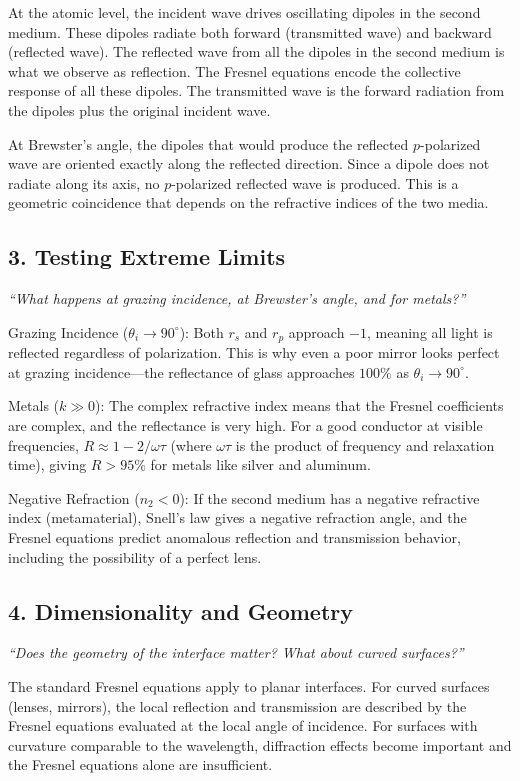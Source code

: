 \documentclass[11pt,openright]{book}
\begin{document}
At the atomic level, the incident wave drives oscillating dipoles in the second medium. These dipoles radiate both forward (transmitted wave) and backward (reflected wave). The reflected wave from all the dipoles in the second medium is what we observe as reflection. The Fresnel equations encode the collective response of all these dipoles. The transmitted wave is the forward radiation from the dipoles plus the original incident wave.

At Brewster's angle, the dipoles that would produce the reflected $p$-polarized wave are oriented exactly along the reflected direction. Since a dipole does not radiate along its axis, no $p$-polarized reflected wave is produced. This is a geometric coincidence that depends on the refractive indices of the two media.

\subsection*{3. Testing Extreme Limits}
\textit{``What happens at grazing incidence, at Brewster's angle, and for metals?''}

Grazing Incidence ($\theta_i \to 90^\circ$): Both $r_s$ and $r_p$ approach $-1$, meaning all light is reflected regardless of polarization. This is why even a poor mirror looks perfect at grazing incidence---the reflectance of glass approaches $100\%$ as $\theta_i \to 90^\circ$.

Metals ($k \gg 0$): The complex refractive index means that the Fresnel coefficients are complex, and the reflectance is very high. For a good conductor at visible frequencies, $R \approx 1 - 2/\omega\tau$ (where $\omega\tau$ is the product of frequency and relaxation time), giving $R > 95\%$ for metals like silver and aluminum.

Negative Refraction ($n_2 < 0$): If the second medium has a negative refractive index (metamaterial), Snell's law gives a negative refraction angle, and the Fresnel equations predict anomalous reflection and transmission behavior, including the possibility of a perfect lens.

\subsection*{4. Dimensionality and Geometry}
\textit{``Does the geometry of the interface matter? What about curved surfaces?''}

The standard Fresnel equations apply to planar interfaces. For curved surfaces (lenses, mirrors), the local reflection and transmission are described by the Fresnel equations evaluated at the local angle of incidence. For surfaces with curvature comparable to the wavelength, diffraction effects become important and the Fresnel equations alone are insufficient.
\end{document}
